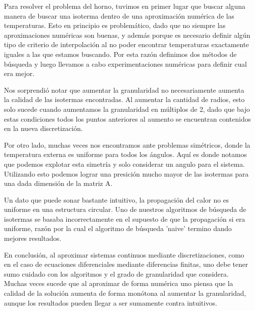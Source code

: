 Para resolver el problema del horno, tuvimos en primer lugar que buscar alguna manera de buscar una isoterma dentro de una aproximación numérica de las temperaturas. Esto en principio es problemático, dado que no siempre las aproximaciones numéricas son buenas, y además porque es necesario definir algún tipo de criterio de interpolación al no poder encontrar temperaturas exactamente iguales a las que estamos buscando. Por esta razón definimos dos métodos de búsqueda y luego llevamos a cabo experimentaciones numéricas para definir cual era mejor. 

Nos sorprendió notar que aumentar la granularidad no necesariamente aumenta la calidad de las isotermas encontradas. Al aumentar la cantidad de radios, esto solo sucede cuando aumentamos la granularidad en múltiplos de 2, dado que bajo estas condiciones todos los puntos anteriores al aumento se encuentran contenidos en la nueva discretización.

Por otro lado, muchas veces nos encontramos ante problemas simétricos, donde la temperatura externa es uniforme para todos los ángulos. Aquí es donde notamos que podemos explotar esta simetría y solo considerar un angulo para el sistema. Utilizando esto podemos lograr una presición mucho mayor de las isotermas para una dada dimensión de la matriz A.

Un dato que puede sonar bastante intuitivo, la propagación del calor no es uniforme en una estructura circular. Uno de nuestros algoritmos de búsqueda de isotermas se basaba incorrectamente en el supuesto de que la propagación si era uniforme, razón por la cual el algoritmo de búsqueda 'naive' termino dando mejores resultados.

En conclusión, al aproximar sistemas continuos mediante discretizaciones, como en el caso de ecuaciones diferenciales mediante diferencias finitas, uno debe tener sumo cuidado con los algoritmos y el grado de granularidad que considera. Muchas veces sucede que al aproximar de forma numérica uno piensa que la calidad de la solución aumenta de forma monótona al aumentar la granularidad, aunque los resultados pueden llegar a ser sumamente contra intuitivos.